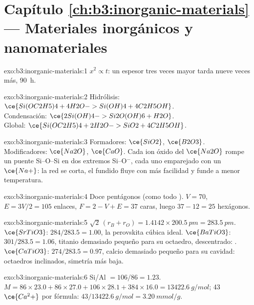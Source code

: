 \section*{Capítulo \ref{ch:b3:inorganic-materials} --- Materiales inorgánicos y nanomateriales}

\begin{solution}{exo:b3:inorganic-materials:1}
$x^2 \propto t$: un espesor tres veces mayor tarda nueve veces más, \qty{90}{h}.
\end{solution}

\begin{solution}{exo:b3:inorganic-materials:2}
Hidrólisis: $\ce{Si(OC2H5)4 + 4H2O -> Si(OH)4 + 4C2H5OH}$.\\
Condensación: $\ce{2Si(OH)4 -> Si2O(OH)6 + H2O}$.\\
Global: $\ce{Si(OC2H5)4 + 2H2O -> SiO2 + 4C2H5OH}$.
\end{solution}

\begin{solution}{exo:b3:inorganic-materials:3}
Formadores: $\ce{SiO2}$, $\ce{B2O3}$. Modificadores: $\ce{Na2O}$, $\ce{CaO}$. Cada ion óxido del $\ce{Na2O}$ rompe un puente Si--O--Si
en dos extremos Si--O$^-$, cada uno emparejado con un $\ce{Na+}$: la red se corta, el fundido
fluye con más facilidad y funde a menor temperatura.
\end{solution}

\begin{solution}{exo:b3:inorganic-materials:4}
Doce pentágonos (como todo ). $V = 70$, $E = 3V/2 = 105$ enlaces, $F = 2 - V + E = 37$
caras, luego $37 - 12 = 25$ hexágonos.
\end{solution}

\begin{solution}{exo:b3:inorganic-materials:5}
$\sqrt2\,(r_B + r_O) = 1.4142 \times \qty{200.5}{pm} = \qty{283.5}{pm}$. $\ce{SrTiO3}$: $284/283.5 = 1.00$, la perovskita cúbica ideal.
$\ce{BaTiO3}$: $301/283.5 = 1.06$, titanio demasiado pequeño para su octaedro, descentrado: .
$\ce{CaTiO3}$: $274/283.5 = 0.97$, calcio demasiado pequeño para su cavidad: octaedros inclinados, simetría
más baja.
\end{solution}

\begin{solution}{exo:b3:inorganic-materials:6}
Si/Al $= 106/86 = 1.23$. $M = 86 \times 23.0 + 86 \times 27.0 + 106 \times 28.1 + 384 \times 16.0 = \qty{13422.6}{g/mol}$; 43 $\ce{Ca^2+}$ por
fórmula: $43/\qty{13422.6}{g/mol} = \qty{3.20}{mmol/g}$.
\end{solution}

